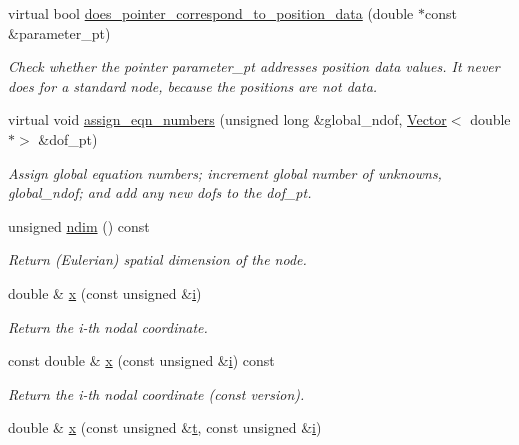 \begin{DoxyCompactItemize}
virtual bool \hyperlink{classoomph_1_1Node_ab5d4bea7ffc69a82fde5720a2a6d784c}{does\+\_\+pointer\+\_\+correspond\+\_\+to\+\_\+position\+\_\+data} (double $\ast$const \&parameter\+\_\+pt)
\begin{DoxyCompactList}\small\item\em Check whether the pointer parameter\+\_\+pt addresses position data values. It never does for a standard node, because the positions are not data. \end{DoxyCompactList}\item 
virtual void \hyperlink{classoomph_1_1Node_a84ee77907c07ede64d98e809d9b0ffe0}{assign\+\_\+eqn\+\_\+numbers} (unsigned long \&global\+\_\+ndof, \hyperlink{classoomph_1_1Vector}{Vector}$<$ double $\ast$$>$ \&dof\+\_\+pt)
\begin{DoxyCompactList}\small\item\em Assign global equation numbers; increment global number of unknowns, global\+\_\+ndof; and add any new dofs to the dof\+\_\+pt. \end{DoxyCompactList}\item 
unsigned \hyperlink{classoomph_1_1Node_a786c96a8e46eb27a03b2b31f629d41b3}{ndim} () const
\begin{DoxyCompactList}\small\item\em Return (Eulerian) spatial dimension of the node. \end{DoxyCompactList}\item 
double \& \hyperlink{classoomph_1_1Node_a056f8e82da938369cd38541c5cdc598a}{x} (const unsigned \&\hyperlink{cfortran_8h_adb50e893b86b3e55e751a42eab3cba82}{i})
\begin{DoxyCompactList}\small\item\em Return the i-\/th nodal coordinate. \end{DoxyCompactList}\item 
const double \& \hyperlink{classoomph_1_1Node_aa222576ddc1a859fbbfe1f31f79cee7d}{x} (const unsigned \&\hyperlink{cfortran_8h_adb50e893b86b3e55e751a42eab3cba82}{i}) const
\begin{DoxyCompactList}\small\item\em Return the i-\/th nodal coordinate (const version). \end{DoxyCompactList}\item 
double \& \hyperlink{classoomph_1_1Node_a7b8665721f9a4550ab3b027ced4b958d}{x} (const unsigned \&\hyperlink{cfortran_8h_af6f0bd3dc13317f895c91323c25c2b8f}{t}, const unsigned \&\hyperlink{cfortran_8h_adb50e893b86b3e55e751a42eab3cba82}{i})
$$
\end{DoxyCompactItemize}
